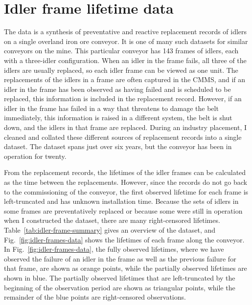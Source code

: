 \section{Idler frame lifetime data} \label{sec:idler-frame-data-desc}

The data is a synthesis of preventative and reactive replacement records of idlers on a single overland iron ore conveyor. It is one of many such datasets for similar conveyors on the mine. This particular conveyor has 143 frames of idlers, each with a three-idler configuration. When an idler in the frame fails, all three of the idlers are usually replaced, so each idler frame can be viewed as one unit. The replacements of the idlers in a frame are often captured in the CMMS, and if an idler in the frame has been observed as having failed and is scheduled to be replaced, this information is included in the replacement record. However, if an idler in the frame has failed in a way that threatens to damage the belt immediately, this information is raised in a different system, the belt is shut down, and the idlers in that frame are replaced. During an industry placement, I cleaned and collated these different sources of replacement records into a single dataset. The dataset spans just over six years, but the conveyor has been in operation for twenty.

From the replacement records, the lifetimes of the idler frames can be calculated as the time between the replacements. However, since the records do not go back to the commissioning of the conveyor, the first observed lifetime for each frame is left-truncated and has unknown installation time. Because the sets of idlers in some frames are preventatively replaced or because some were still in operation when I constructed the dataset, there are many right-censored lifetimes. Table~\ref{tab:idler-frame-summary} gives an overview of the dataset, and Fig.~\ref{fig:idler-frames-data} shows the lifetimes of each frame along the conveyor. In Fig.~\ref{fig:idler-frames-data}, the fully observed lifetimes, where we have observed the failure of an idler in the frame as well as the previous failure for that frame, are shown as orange points, while the partially observed lifetimes are shown in blue. The partially observed lifetimes that are left-truncated by the beginning of the observation period are shown as triangular points, while the remainder of the blue points are right-censored observations.



